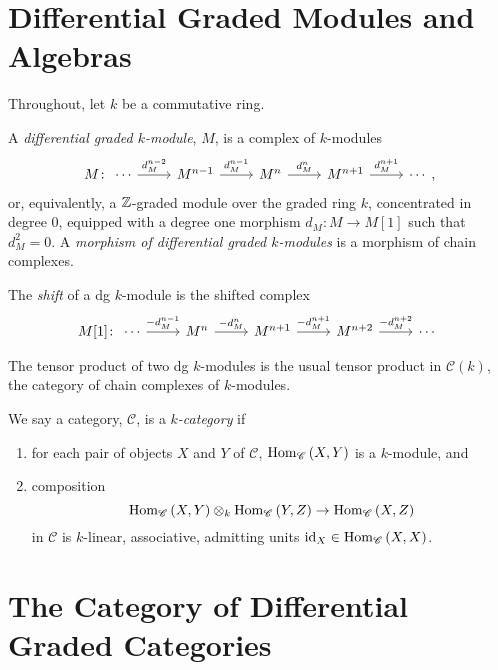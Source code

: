\documentclass[dissertation.tex]{subfiles}
\begin{document}
\section{Differential Graded Modules and Algebras}
{\noindent Throughout, let $k$ be a commutative ring.}

\begin{defn}
  A {\it differential graded $k$-module}, $M$, is a complex of $k$-modules
  $$M \colon \begin{tikzcd}
    \cdots \arrow{r}{d_M^{n-2}} & M^{n-1} \arrow{r}{d_M^{n-1}} & M^n \arrow{r}{d_M^n} & M^{n+1} \arrow{r}{d_M^{n+1}} & \cdots
  \end{tikzcd},$$
  or, equivalently, a $\mathbb{Z}$-graded module over the graded ring $k$, concentrated in degree 0, equipped with a degree one morphism $d_M : M \rightarrow M[1]$ such that $d_M^2 = 0$.
  A {\it morphism of differential graded $k$-modules} is a morphism of chain complexes.
  
  The {\it shift} of a dg $k$-module is the shifted complex
  $$M[1] \colon \begin{tikzcd}
    \cdots \arrow{r}{-d_M^{n-1}} & M^{n} \arrow{r}{-d_M^{n}} & M^{n+1} \arrow{r}{-d_M^{n+1}} & M^{n+2} \arrow{r}{-d_M^{n+2}} & \cdots
  \end{tikzcd}$$
  
  The tensor product of two dg $k$-modules is the usual tensor product in $\mathcal{C}(k)$, the category of chain complexes of $k$-modules.
\end{defn}

\begin{defn}
  We say a category, $\mathscr{C}$, is a {\it $k$-category} if
  \begin{enumerate}
  \item
    for each pair of objects $X$ and $Y$ of $\mathscr{C}$, $\operatorname{Hom}_{\mathscr{C}}\left(X,Y\right)$ is a $k$-module, and
  \item
    composition 
    $$\operatorname{Hom}_{\mathscr{C}}\left(X,Y\right) \otimes_k \operatorname{Hom}_{\mathscr{C}}\left(Y,Z\right) \rightarrow \operatorname{Hom}_{\mathscr{C}}\left(X,Z\right)$$
    in $\mathscr{C}$ is $k$-linear, associative, admitting units $\operatorname{id}_X \in \operatorname{Hom}_{\mathscr{C}}\left(X,X\right)$.
  \end{enumerate}
\end{defn}

\section{The Category of Differential Graded Categories}
\end{document}
